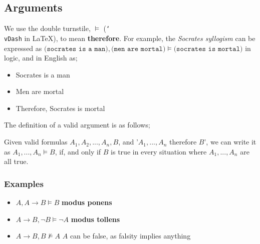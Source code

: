\documentclass[a4paper, 12pt]{article}
\begin{document}
        \subsection*{Arguments}
            We use the double turnstile, $\vDash$ (\texttt{\char`\\vDash} in \LaTeX), to mean \textbf{therefore}. For example, the \textit{Socrates syllogism} can be expressed as $\texttt{(socrates is a man)}, \texttt{(men are mortal)} \vDash \texttt{(socrates is mortal)}$ in logic, and in English as;
            \begin{itemize}
                \itemsep0em
                \item Socrates is a man
                \item Men are mortal
                \item Therefore, Socrates is mortal
            \end{itemize}
            \medskip

            The definition of a valid argument is as follows;
            \smallskip

            Given valid formulas $A_1, A_2, ..., A_n, B$, and '$A_1, ..., A_n$ therefore $B$', we can write it as $A_1, ..., A_n \vDash B$, if, and only if $B$ is true in every situation where $A_1, ..., A_n$ are all true.
            \subsubsection*{Examples}
                \begin{itemize}
                    \itemsep0em
                    \item $A, A \rightarrow B \vDash B$ \hfill \textbf{modus ponens}
                    \item $A \rightarrow B, \neg B \vDash \neg A$ \hfill \textbf{modus tollens}
                    \item $A \rightarrow B, B \nvDash A$ \hfill $A$ can be false, as falsity implies anything
                \end{itemize}
\end{document}
